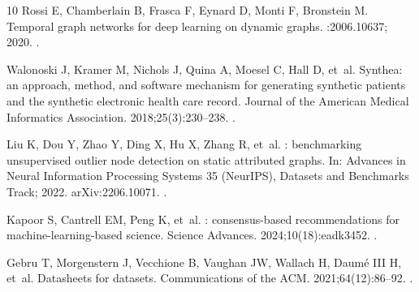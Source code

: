 \documentclass[pdflatex,sn-vancouver-num]{sn-jnl}
\begin{document}
\begin{thebibliography}{10}
Rossi E, Chamberlain B, Frasca F, Eynard D, Monti F, Bronstein M. Temporal
  graph networks for deep learning on dynamic graphs.
:2006.10637; 2020.
\newblock {}.

Walonoski J, Kramer M, Nichols J, Quina A, Moesel C, Hall D, et~al.
\newblock Synthea: an approach, method, and software mechanism for generating
  synthetic patients and the synthetic electronic health care record.
\newblock Journal of the American Medical Informatics Association.
  2018;25(3):230--238.
\newblock {}.

Liu K, Dou Y, Zhao Y, Ding X, Hu X, Zhang R, et~al.
: benchmarking unsupervised outlier node detection on static
  attributed graphs.
\newblock In: Advances in Neural Information Processing Systems 35 (NeurIPS),
  Datasets and Benchmarks Track; 2022. {arXiv}:2206.10071.
\newblock {}.

Kapoor S, Cantrell EM, Peng K, et~al.
: consensus-based recommendations for machine-learning-based
  science.
\newblock Science Advances. 2024;10(18):eadk3452.
\newblock {}.

Gebru T, Morgenstern J, Vecchione B, Vaughan JW, Wallach H, {Daum{\'e} III} H,
  et~al.
\newblock Datasheets for datasets.
\newblock Communications of the ACM. 2021;64(12):86--92.
\newblock {}.

\end{thebibliography}
\end{document}
